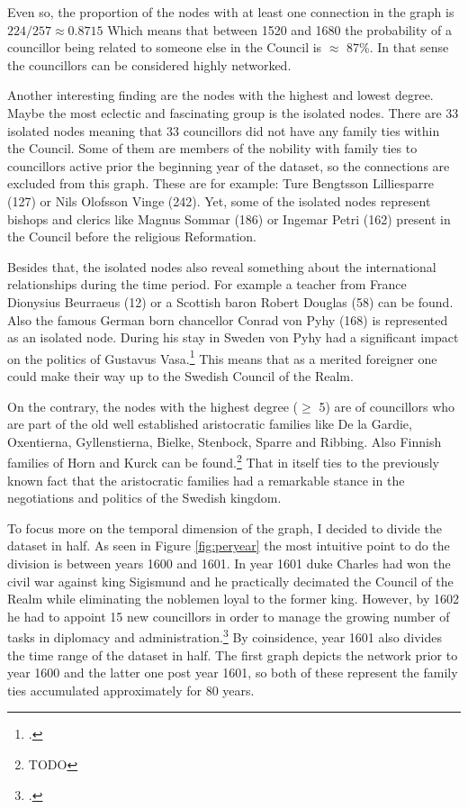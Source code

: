 Even so, the proportion of the nodes with at least one connection in the graph is $224/257 \approx 0.8715$ Which means that between 1520 and 1680 the probability of a councillor being related to someone else in the Council is $\approx$ 87\%. In that sense the councillors can be considered highly networked.

Another interesting finding are the nodes with the highest and lowest degree. Maybe the most eclectic and fascinating group is the isolated nodes. There are 33 isolated nodes meaning that 33 councillors did not have any family ties within the Council. Some of them are members of the nobility with family ties to councillors active prior the beginning year of the dataset, so the connections are excluded from this graph. These are for example: Ture Bengtsson Lilliesparre (127) or Nils Olofsson Vinge (242). Yet, some of the isolated nodes represent bishops and clerics like Magnus Sommar (186) or Ingemar Petri (162) present in the Council before the religious Reformation. 

Besides that, the isolated nodes also reveal something about the international relationships during the time period. For example a teacher from France Dionysius Beurraeus (12) or a Scottish baron Robert Douglas (58) can be found. Also the famous German born chancellor Conrad von Pyhy (168) is represented as an isolated node. During his stay in Sweden von Pyhy had a significant impact on the politics of Gustavus Vasa.\footcite[pp. 81-83.]{pSuurvalta} This means that as a merited foreigner one could make their way up to the Swedish Council of the Realm.

On the contrary, the nodes with the highest degree ($\geq$ 5) are of councillors who are part of the old well established aristocratic families like De la Gardie, Oxentierna, Gyllenstierna, Bielke, Stenbock, Sparre and Ribbing. Also Finnish families of Horn and Kurck can be found.\footnote{TODO} That in itself ties to the previously known fact that the aristocratic families had a remarkable stance in the negotiations and politics of the Swedish kingdom.

To focus more on the temporal dimension of the graph, I decided to divide the dataset in half. As seen in Figure \ref{fig:peryear} the most intuitive point to do the division is between years 1600 and 1601. In year 1601 duke Charles had won the civil war against king Sigismund and he practically decimated the Council of the Realm while eliminating the noblemen loyal to the former king. However, by 1602 he had to appoint 15 new councillors in order to manage the growing number of tasks in diplomacy and administration.\footcite[TODO]{pSuurvalta} By coinsidence, year 1601 also divides the time range of the dataset in half. The first graph depicts the network prior to year 1600 and the latter one post year 1601, so both of these represent the family ties accumulated approximately for 80 years.

